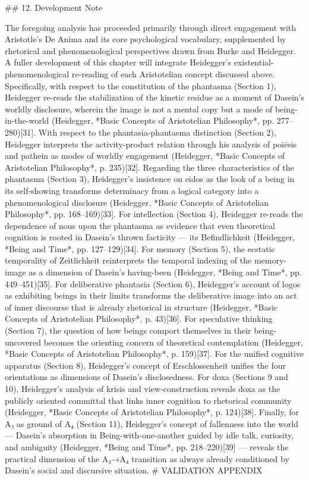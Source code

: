 ## 12. Development Note

The foregoing analysis has proceeded primarily through direct engagement with Aristotle's De Anima and its core psychological vocabulary, supplemented by rhetorical and phenomenological perspectives drawn from Burke and Heidegger. A fuller development of this chapter will integrate Heidegger's existential-phenomenological re-reading of each Aristotelian concept discussed above. Specifically, with respect to the constitution of the phantasma (Section 1), Heidegger re-reads the stabilization of the kinetic residue as a moment of Dasein's worldly disclosure, wherein the image is not a mental copy but a mode of being-in-the-world (Heidegger, *Basic Concepts of Aristotelian Philosophy*, pp. 277–280)[31]. With respect to the phantasia-phantasma distinction (Section 2), Heidegger interprets the activity-product relation through his analysis of poiēsis and pathein as modes of worldly engagement (Heidegger, *Basic Concepts of Aristotelian Philosophy*, p. 235)[32]. Regarding the three characteristics of the phantasma (Section 3), Heidegger's insistence on eidos as the look of a being in its self-showing transforms determinacy from a logical category into a phenomenological disclosure (Heidegger, *Basic Concepts of Aristotelian Philosophy*, pp. 168–169)[33]. For intellection (Section 4), Heidegger re-reads the dependence of nous upon the phantasma as evidence that even theoretical cognition is rooted in Dasein's thrown facticity — its Befindlichkeit (Heidegger, *Being and Time*, pp. 127–129)[34]. For memory (Section 5), the ecstatic temporality of Zeitlichkeit reinterprets the temporal indexing of the memory-image as a dimension of Dasein's having-been (Heidegger, *Being and Time*, pp. 449–451)[35]. For deliberative phantasia (Section 6), Heidegger's account of logos as exhibiting beings in their limits transforms the deliberative image into an act of inner discourse that is already rhetorical in structure (Heidegger, *Basic Concepts of Aristotelian Philosophy*, p. 43)[36]. For speculative thinking (Section 7), the question of how beings comport themselves in their being-uncovered becomes the orienting concern of theoretical contemplation (Heidegger, *Basic Concepts of Aristotelian Philosophy*, p. 159)[37]. For the unified cognitive apparatus (Section 8), Heidegger's concept of Erschlossenheit unifies the four orientations as dimensions of Dasein's disclosedness. For doxa (Sections 9 and 10), Heidegger's analysis of krisis and view-construction reveals doxa as the publicly oriented committal that links inner cognition to rhetorical community (Heidegger, *Basic Concepts of Aristotelian Philosophy*, p. 124)[38]. Finally, for A₃ as ground of A₄ (Section 11), Heidegger's concept of fallenness into the world — Dasein's absorption in Being-with-one-another guided by idle talk, curiosity, and ambiguity (Heidegger, *Being and Time*, pp. 218–220)[39] — reveals the practical dimension of the A₃→A₄ transition as always already conditioned by Dasein's social and discursive situation. # VALIDATION APPENDIX

